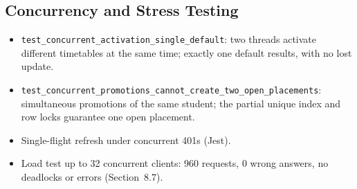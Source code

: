 \subsection{Concurrency and Stress Testing}
\begin{itemize}
\item \texttt{test\_concurrent\_activation\_single\_default}: two threads activate different timetables
      at the same time; exactly one default results, with no lost update.
\item \texttt{test\_concurrent\_promotions\_cannot\_create\_two\_open\_placements}: simultaneous
      promotions of the same student; the partial unique index and row locks guarantee one open placement.
\item Single-flight refresh under concurrent 401s (Jest).
\item Load test up to 32 concurrent clients: 960 requests, 0 wrong answers, no deadlocks or errors
      (Section~8.7).
\end{itemize}

